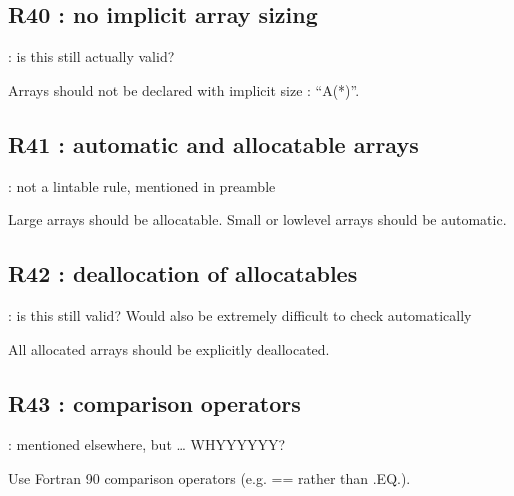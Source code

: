 \documentclass[letterpaper,10pt,english]{sphinxmanual}
\begin{document}
\sphinxstepscope


\subsection{R40 :  no implicit array sizing}
\label{\detokenize{obsolescent/r40:r40-no-implicit-array-sizing}}\label{\detokenize{obsolescent/r40::doc}}
\sphinxAtStartPar
{} : is this still actually valid?

\sphinxAtStartPar
Arrays should not be declared with implicit size : “A(*)”.

\sphinxstepscope


\subsection{R41 :  automatic and allocatable arrays}
\label{\detokenize{obsolescent/r41:r41-automatic-and-allocatable-arrays}}\label{\detokenize{obsolescent/r41::doc}}
\sphinxAtStartPar
{} : not a lintable rule, mentioned in preamble

\sphinxAtStartPar
Large arrays should be allocatable. Small or low\sphinxhyphen{}level arrays should be automatic.

\sphinxstepscope


\subsection{R42 : deallocation of allocatables}
\label{\detokenize{obsolescent/r42:r42-deallocation-of-allocatables}}\label{\detokenize{obsolescent/r42::doc}}
\sphinxAtStartPar
{} : is this still valid? Would also be extremely difficult to check automatically

\sphinxAtStartPar
All allocated arrays should be explicitly deallocated.

\sphinxstepscope


\subsection{R43 : comparison operators}
\label{\detokenize{obsolescent/r43:r43-comparison-operators}}\label{\detokenize{obsolescent/r43::doc}}
\sphinxAtStartPar
{} : mentioned elsewhere, but … WHYYYYYY?

\sphinxAtStartPar
Use Fortran 90 comparison operators (e.g. == rather than .EQ.).

\sphinxstepscope
\end{document}
